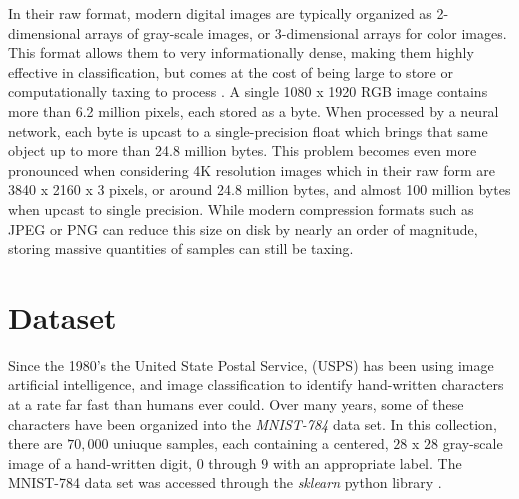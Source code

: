 \documentclass{IEEEtran}
\begin{document}
In their raw format, modern digital images are typically organized as 2-dimensional arrays of gray-scale images, or 3-dimensional arrays for color images. This format allows them to very informationally dense, making them highly effective in classification, but comes at the cost of being large to store or computationally taxing to process \cite{Goodfellow}. A single 1080 x 1920 RGB image contains more than 6.2 million pixels, each stored as a byte. When processed by a neural network, each byte is upcast to a single-precision float which brings that same object up to more than 24.8 million bytes. This problem becomes even more pronounced when considering 4K resolution images which in their raw form are 3840 x 2160 x 3 pixels, or around 24.8 million bytes, and almost 100 million bytes when upcast to single precision. While modern compression formats such as JPEG or PNG can reduce this size on disk by nearly an order of magnitude, storing massive quantities of samples can still be taxing. 

\section{Dataset}

Since the 1980's the United State Postal Service, (USPS) has been using image artificial intelligence, and image classification to identify hand-written characters at a rate far fast than humans ever could. Over many years, some of these characters have been organized into the \textit{MNIST-784} data set. In this collection, there are $70,000$ uniuque samples, each containing a centered, $28$ x $28$ gray-scale image of a hand-written digit, $0$ through $9$ with an appropriate label. The MNIST-784 data set was accessed through the \textit{sklearn} python library \cite{Sklearn}.
\end{document}
